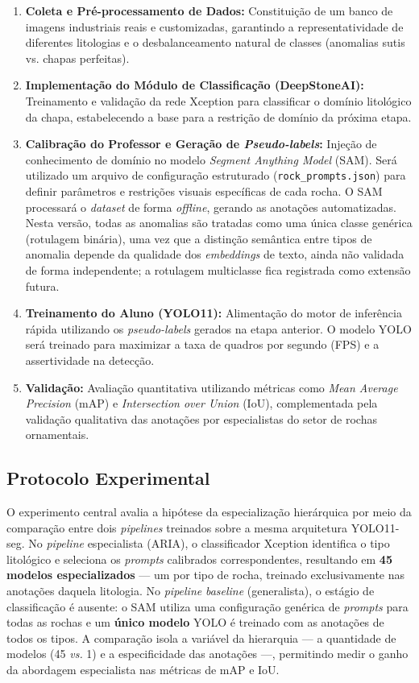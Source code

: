 \begin{enumerate}
    \item \textbf{Coleta e Pré-processamento de Dados:} Constituição de um banco de imagens industriais reais e customizadas, garantindo a representatividade de diferentes litologias e o desbalanceamento natural de classes (anomalias sutis vs. chapas perfeitas).
    \item \textbf{Implementação do Módulo de Classificação (DeepStoneAI):} Treinamento e validação da rede Xception para classificar o domínio litológico da chapa, estabelecendo a base para a restrição de domínio da próxima etapa.
    \item \textbf{Calibração do Professor e Geração de \textit{Pseudo-labels}:} Injeção de conhecimento de domínio no modelo \textit{Segment Anything Model} (SAM). Será utilizado um arquivo de configuração estruturado (\texttt{rock\_prompts.json}) para definir parâmetros e restrições visuais específicas de cada rocha. O SAM processará o \textit{dataset} de forma \textit{offline}, gerando as anotações automatizadas. Nesta versão, todas as anomalias são tratadas como uma única classe genérica (rotulagem binária), uma vez que a distinção semântica entre tipos de anomalia depende da qualidade dos \textit{embeddings} de texto, ainda não validada de forma independente; a rotulagem multiclasse fica registrada como extensão futura.
    \item \textbf{Treinamento do Aluno (YOLO11):} Alimentação do motor de inferência rápida utilizando os \textit{pseudo-labels} gerados na etapa anterior. O modelo YOLO será treinado para maximizar a taxa de quadros por segundo (FPS) e a assertividade na detecção.
    \item \textbf{Validação:} Avaliação quantitativa utilizando métricas como \textit{Mean Average Precision} (mAP) e \textit{Intersection over Union} (IoU), complementada pela validação qualitativa das anotações por especialistas do setor de rochas ornamentais.
\end{enumerate}

\subsection{Protocolo Experimental}
O experimento central avalia a hipótese da especialização hierárquica por meio da comparação entre dois \textit{pipelines} treinados sobre a mesma arquitetura YOLO11-seg. No \textit{pipeline} especialista (ARIA), o classificador Xception identifica o tipo litológico e seleciona os \textit{prompts} calibrados correspondentes, resultando em \textbf{45 modelos especializados} --- um por tipo de rocha, treinado exclusivamente nas anotações daquela litologia. No \textit{pipeline} \textit{baseline} (generalista), o estágio de classificação é ausente: o SAM utiliza uma configuração genérica de \textit{prompts} para todas as rochas e um \textbf{único modelo} YOLO é treinado com as anotações de todos os tipos. A comparação isola a variável da hierarquia --- a quantidade de modelos (45 \textit{vs.} 1) e a especificidade das anotações ---, permitindo medir o ganho da abordagem especialista nas métricas de mAP e IoU.

